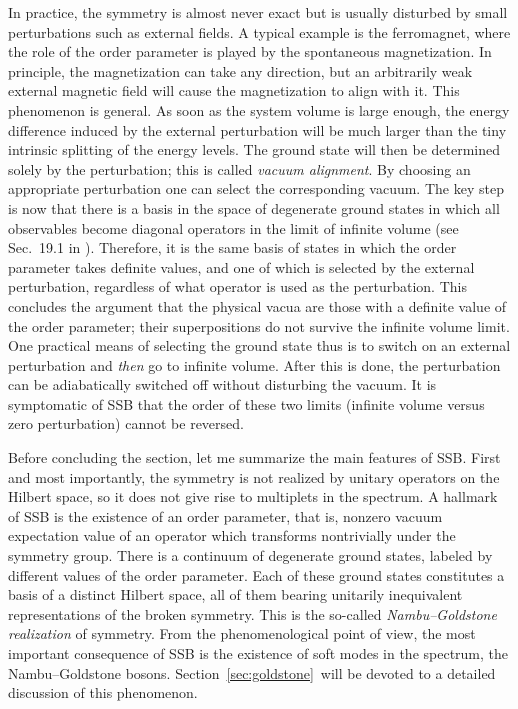 \documentclass[final,2p,times,12pt,sort&compress]{elsarticle}
\begin{document}
In practice, the symmetry is almost never exact but is usually disturbed by
small perturbations such as external fields. A typical example is the
ferromagnet, where the role of the order parameter is played by the spontaneous
magnetization. In principle, the magnetization can take any direction, but an
arbitrarily weak external magnetic field will cause the magnetization to align
with it. This phenomenon is general. As soon as the system volume is
large enough, the energy difference induced by the external perturbation will
be much larger than the tiny intrinsic splitting of the energy levels. The
ground state will then be determined solely by the perturbation; this is called
\emph{vacuum alignment}. By choosing an appropriate perturbation one can select
the corresponding vacuum. The key step is now that there is a basis in the
space of degenerate ground states in which all observables become diagonal
operators in the limit of infinite volume (see Sec.~19.1 in
\cite{Weinberg:1996v2}). Therefore, it
is the same basis of states in which the order parameter takes definite values,
and one of which is selected by the external perturbation, regardless of what
operator is used as the perturbation. This concludes the argument that the
physical vacua are those with a definite value of the order parameter; their
superpositions do not survive the infinite volume limit. One practical means of
selecting the ground state thus is to switch on an external perturbation and
\emph{then} go to infinite volume. After this is done, the perturbation can be
adiabatically switched off without disturbing the vacuum. It is symptomatic of
SSB that the order of these two limits (infinite volume versus zero
perturbation) cannot be reversed.

Before concluding the section, let me summarize the main features of SSB. First
and most importantly, the symmetry is not realized by unitary operators on the
Hilbert space, so it does not give rise to multiplets in the spectrum. A
hallmark of SSB is the existence of an order parameter, that is, nonzero vacuum
expectation value of an operator which transforms nontrivially under the
symmetry group. There is a continuum of degenerate ground states,
labeled by different values of the order parameter. Each of these ground states
constitutes a basis of a distinct Hilbert space, all of them bearing unitarily
inequivalent representations of the broken symmetry. This is the so-called
\emph{Nambu--Goldstone realization} of symmetry. From the phenomenological
point of view, the most important consequence of SSB is the existence of soft
modes in the spectrum, the Nambu--Goldstone bosons.
Section~\ref{sec:goldstone}\ will be devoted to a detailed discussion of this
phenomenon.
\end{document}
